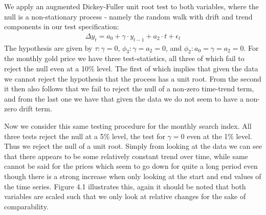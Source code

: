 \documentclass[a4paper]{article}
\theoremstyle{definition}
\begin{document}
We apply an augmented Dickey-Fuller unit root test to both variables, where the null is a non-stationary process - namely the random walk with drift and trend components in our test specification:
	\begin{align*}
	 \Delta y_t = a_0 + \gamma \cdot y_{t-1} + a_2 \cdot t + \epsilon_{t}
	\end{align*}
The hypothesis are given by $\tau: \gamma = 0$, $\phi_3: \gamma = a_2 = 0$, and $\phi_2: a_0 = \gamma = a_2 = 0$. For the monthly gold price we have three test-statistics, all three of which fail to reject the null even at a 10\% level. The first of which implies that given the data we cannot reject the hypothesis that the process has a unit root. From the second it then also follows that we fail to reject the null of a non-zero time-trend term, and from the last one we have that given the data we do not seem to have a non-zero drift term.

Now we consider this same testing procedure for the monthly search index. All three tests reject the null at a 5\% level, the test for $\gamma = 0$ even at the 1\% level. Thus we reject the null of a unit root. Simply from looking at the data we can see that there appears to be some relatively constant trend over time, while same cannot be said for the prices which seem to go down for quite a long period even though there is a strong increase when only looking at the start and end values of the time series. Figure 4.1 illustrates this, again it should be noted that both variables are scaled such that we only look at relative changes for the sake of comparability.
\end{document}
